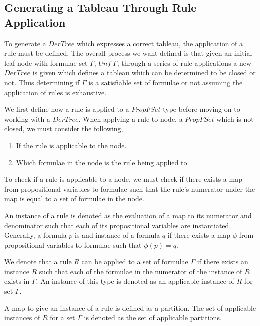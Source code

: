 \subsection{Generating a Tableau Through Rule Application}

To generate a $DerTree$ which expresses a correct tableau, the application of
a rule must be defined. The overall process we want defined is that given an
initial leaf node with formulae set $\Gamma$, $Unf\; \Gamma$, through a series
of rule applications a new $DerTree$ is given which defines a tableau which can
be determined to be closed or not. Thus determining if $\Gamma$ is a
satisfiable set of formulae or not assuming the application of rules is
exhaustive.

We first define how a rule is applied to a $PropFSet$ type before moving on
to working with a $DerTree$. When applying a rule to node, a $PropFSet$ which
is not closed, we must consider the following,

\begin{enumerate}
\item If the rule is applicable to the node.
\item Which formulae in the node is the rule being applied to.
\end{enumerate}

To check if a rule is applicable to a node, we must check if there exists a map
from propositional variables to formulae such that the rule's numerator under
the map is equal to a set of formulae in the node.

\begin{definition}
An instance of a rule is denoted as the evaluation of a map to its numerator
and denominator such that each of its propositional variables are instantiated.
Generally, a formula $p$ is and instance of a formula $q$ if there exists a
map $\phi$ from propositional variables to formulae such that $\phi(p) = q$.

We denote that a rule $R$ can be applied to a set of formulae $\Gamma$ if there
exists an instance $R$ such that each of the formulae in the numerator of the
instance of $R$ exists in $\Gamma$. An instance of this type is denoted as an
applicable instance of $R$ for set $\Gamma$.

A map to give an instance of a rule is defined as a partition. The set of
applicable instances of $R$ for a set $\Gamma$ is denoted as the set of
applicable partitions.
\end{definition}

